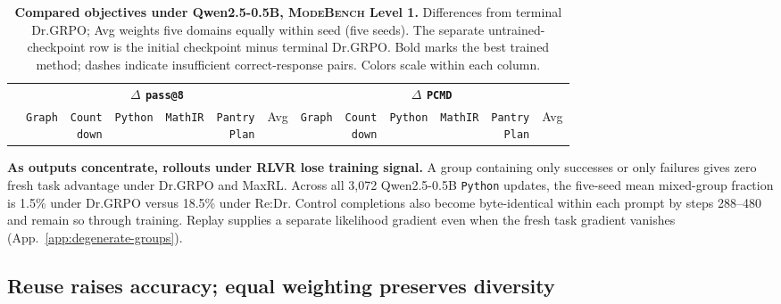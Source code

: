 \documentclass{article}
\newcommand{\1}{\mathbf 1}
\newcommand{\mb}{\textsc{ModeBench}}
\newcommand{\pmd}{\texttt{PCMD}}
\theoremstyle{remark}
\theoremstyle{definition}
\theoremstyle{plain}
\begin{document}
\begin{table}[!b]
  \centering
  \caption{\textbf{Compared objectives under Qwen2.5-0.5B, \mb{} Level 1.} Differences from terminal Dr.GRPO; Avg weights five domains equally within seed (five seeds). The separate untrained-checkpoint row is the initial checkpoint minus terminal Dr.GRPO. Bold marks the best trained method; dashes indicate insufficient correct-response pairs. Colors scale within each column.}
  \label{tab:direct-comparator-matrix}
  \scriptsize
  \setlength{\tabcolsep}{1.4pt}
  \renewcommand{\arraystretch}{0.95}
  \begin{tabular}{@{}l*{12}{r}@{}}
    \toprule
    & \multicolumn{6}{c}{\textbf{$\Delta$ \texttt{pass@8}}}
      & \multicolumn{6}{c}{\textbf{$\Delta$ \pmd{}}} \\
    \cmidrule(lr){2-7}\cmidrule(l){8-13}
    & \texttt{Graph}
    & \shortstack{\texttt{Count}\\\texttt{down}}
    & \texttt{Python}
    & \texttt{MathIR}
    & \shortstack{\texttt{Pantry}\\\texttt{Plan}}
    & Avg
    & \texttt{Graph}
    & \shortstack{\texttt{Count}\\\texttt{down}}
    & \texttt{Python}
    & \texttt{MathIR}
    & \shortstack{\texttt{Pantry}\\\texttt{Plan}}
    & Avg \\
    \midrule
    
  \end{tabular}
\end{table}


\textbf{As outputs concentrate, rollouts under RLVR lose training signal.}
A group containing only successes or only failures gives zero fresh task advantage under Dr.GRPO and MaxRL. Across all 3,072 Qwen2.5-0.5B \texttt{Python} updates, the five-seed mean mixed-group fraction is 1.5\% under Dr.GRPO versus 18.5\% under Re:Dr. Control completions also become byte-identical within each prompt by steps 288--480 and remain so through training. Replay supplies a separate likelihood gradient even when the fresh task gradient vanishes (App.~\ref{app:degenerate-groups}).

\subsection{Reuse raises accuracy; equal weighting preserves diversity}
\label{sec:results-retention}
\end{document}

